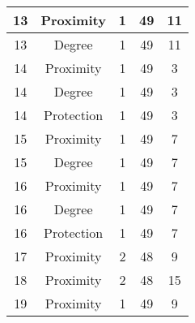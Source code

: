 \documentclass[results.tex]{subfiles}
\begin{document}
\begin{center}
\begin{tabular}{| c || c | c | c | c |}
            \hline
            13                      & Proximity                    & 1                      & 49                      & 11                   \\
            \hline
            13                      & Degree                       & 1                      & 49                      & 11                   \\
            \hline
            14                      & Proximity                    & 1                      & 49                      & 3                    \\
            \hline
            14                      & Degree                       & 1                      & 49                      & 3                    \\
            \hline
            14                      & Protection                   & 1                      & 49                      & 3                    \\
            \hline
            15                      & Proximity                    & 1                      & 49                      & 7                    \\
            \hline
            15                      & Degree                       & 1                      & 49                      & 7                    \\
            \hline
            16                      & Proximity                    & 1                      & 49                      & 7                    \\
            \hline
            16                      & Degree                       & 1                      & 49                      & 7                    \\
            \hline
            16                      & Protection                   & 1                      & 49                      & 7                    \\
            \hline
            17                      & Proximity                    & 2                      & 48                      & 9                    \\
            \hline
            18                      & Proximity                    & 2                      & 48                      & 15                   \\
            \hline
            19                      & Proximity                    & 1                      & 49                      & 9                    \\

\end{tabular}
\end{center}
\end{document}
